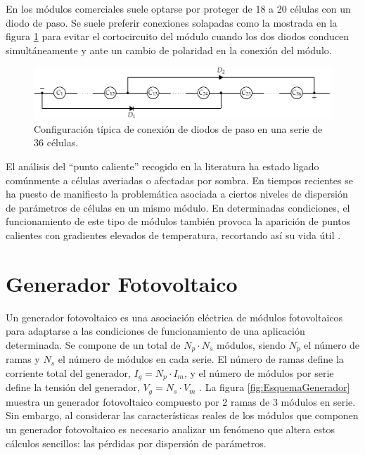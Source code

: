 En los módulos comerciales suele optarse por proteger de 18 a 20 células
con un diodo de paso. Se suele preferir conexiones solapadas como
la mostrada en la figura \ref{fig:ConexionTipicaDiodosPaso} para
evitar el cortocircuito del módulo cuando los dos diodos conducen
simultáneamente y ante un cambio de polaridad en la conexión del módulo.


\begin{figure}
\begin{centering}
\includegraphics{../figs/AsociacionSerieCelulas_DiodosPasoAlternos}
\end{centering}

\caption{Configuración típica de conexión de diodos de paso en una serie de
36 células.\label{fig:ConexionTipicaDiodosPaso}}

\end{figure}

El análisis del {}``punto caliente'' recogido en la literatura ha
estado ligado comúnmente a células averiadas o afectadas por sombra.
En tiempos recientes se ha puesto de manifiesto la problemática asociada
a ciertos niveles de dispersión de parámetros de células en un mismo
módulo. En determinadas condiciones, el funcionamiento de este tipo
de módulos también provoca la aparición de puntos calientes con gradientes
elevados de temperatura, recortando así su vida útil \citep{Lorenzo.Martinez.ea2009}.


\section{Generador Fotovoltaico}

Un generador fotovoltaico es una asociación eléctrica de módulos fotovoltaicos
para adaptarse a las condiciones de funcionamiento de una aplicación
determinada. Se compone de un total de $N_{p}\cdot N_{s}$ módulos,
siendo $N_{p}$ el número de ramas y $N_{s}$ el número de módulos
en cada serie. El número de ramas define la corriente total del generador,
$I_{g}=N_{p}\cdot I_{m}$, y el número de módulos por serie define
la tensión del generador, $V_{g}=N_{s}\cdot V_{m}$
. La figura \ref{fig:EsquemaGenerador} muestra un generador fotovoltaico
compuesto por 2 ramas de 3 módulos en serie. Sin embargo, al considerar
las características reales de los módulos que componen un generador
fotovoltaico es necesario analizar un fenómeno que altera estos cálculos
sencillos: las pérdidas por dispersión de parámetros.


